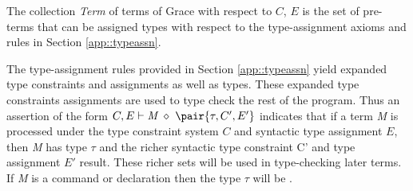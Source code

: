 The collection \emph{Term} of terms of Grace with respect to
$C$, $E$ is the set of pre-terms that can be assigned types with
respect to the type-assignment axioms and rules in Section
\ref{app::typeassn}. 

The type-assignment rules provided in Section \ref{app::typeassn}
yield expanded type constraints and assignments as well as types.
These expanded type constraints assignments are used to type check the
rest of the program.  Thus an assertion of the form $C,E \vdash
\textit{M}\ \diamond \ \pair{\tau, C', E'}$ indicates that if a term
\textit{M} is processed under the type constraint system $C$ and
syntactic type assignment $E$, then \textit{M} has type $\tau$ and the
richer syntactic type constraint C' and type assignment $E'$ result.  
These richer sets will be used in type-checking later terms.
If \textit{M} is a command or declaration then the type $\tau$ will be
\Done.
